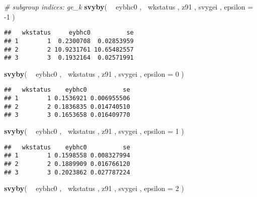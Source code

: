 \documentclass[]{book}
\newenvironment{Shaded}{\begin{snugshade}}{\end{snugshade}}
\newcommand{\CommentTok}[1]{\textcolor[rgb]{0.56,0.35,0.01}{\textit{#1}}}
\newcommand{\DataTypeTok}[1]{\textcolor[rgb]{0.13,0.29,0.53}{#1}}
\newcommand{\DecValTok}[1]{\textcolor[rgb]{0.00,0.00,0.81}{#1}}
\newcommand{\KeywordTok}[1]{\textcolor[rgb]{0.13,0.29,0.53}{\textbf{#1}}}
\newcommand{\NormalTok}[1]{#1}
\newcommand{\OperatorTok}[1]{\textcolor[rgb]{0.81,0.36,0.00}{\textbf{#1}}}
\newcommand{\StringTok}[1]{\textcolor[rgb]{0.31,0.60,0.02}{#1}}
\begin{document}
\begin{Shaded}
\begin{Highlighting}[]
\CommentTok{# subgroup indices: ge_k}
\KeywordTok{svyby}\NormalTok{( }\OperatorTok{~}\StringTok{ }\NormalTok{eybhc0 , }\OperatorTok{~}\NormalTok{wkstatus , z91 , svygei , }\DataTypeTok{epsilon =} \DecValTok{-1}\NormalTok{ )}
\end{Highlighting}
\end{Shaded}

\begin{verbatim}
##   wkstatus     eybhc0          se
## 1        1  0.2300708  0.02853959
## 2        2 10.9231761 10.65482557
## 3        3  0.1932164  0.02571991
\end{verbatim}

\begin{Shaded}
\begin{Highlighting}[]
\KeywordTok{svyby}\NormalTok{( }\OperatorTok{~}\StringTok{ }\NormalTok{eybhc0 , }\OperatorTok{~}\NormalTok{wkstatus , z91 , svygei , }\DataTypeTok{epsilon =} \DecValTok{0}\NormalTok{ )}
\end{Highlighting}
\end{Shaded}

\begin{verbatim}
##   wkstatus    eybhc0          se
## 1        1 0.1536921 0.006955506
## 2        2 0.1836835 0.014740510
## 3        3 0.1653658 0.016409770
\end{verbatim}

\begin{Shaded}
\begin{Highlighting}[]
\KeywordTok{svyby}\NormalTok{( }\OperatorTok{~}\StringTok{ }\NormalTok{eybhc0 , }\OperatorTok{~}\NormalTok{wkstatus , z91 , svygei , }\DataTypeTok{epsilon =} \DecValTok{1}\NormalTok{ )}
\end{Highlighting}
\end{Shaded}

\begin{verbatim}
##   wkstatus    eybhc0          se
## 1        1 0.1598558 0.008327994
## 2        2 0.1889909 0.016766120
## 3        3 0.2023862 0.027787224
\end{verbatim}

\begin{Shaded}
\begin{Highlighting}[]
\KeywordTok{svyby}\NormalTok{( }\OperatorTok{~}\StringTok{ }\NormalTok{eybhc0 , }\OperatorTok{~}\NormalTok{wkstatus , z91 , svygei , }\DataTypeTok{epsilon =} \DecValTok{2}\NormalTok{ )}
\end{Highlighting}
\end{Shaded}
\end{document}

